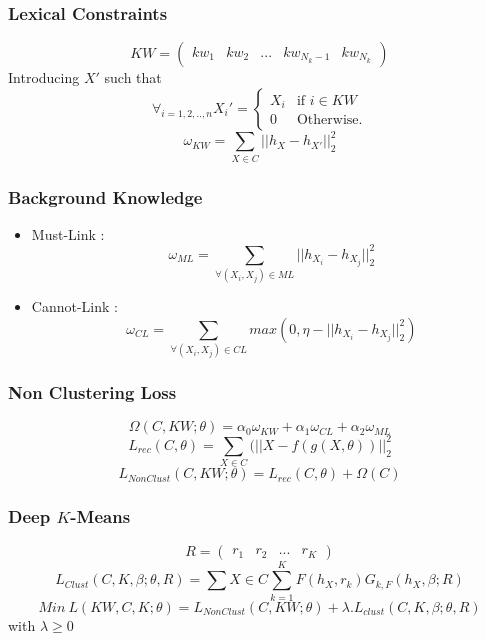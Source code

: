 \documentclass{beamer}
\begin{document}
\begin{frame}
\frametitle{Lexical Constraints}
\begin{equation*}
KW = \begin{pmatrix} kw_1 & kw_2 & ... & kw_{N_k-1} & kw_{N_k}
\end {pmatrix}
\end{equation*}
\pause
Introducing $X'$ such that
\begin{equation*}
\forall_{i=1,2,..,n}X_i' = \left\{
\begin{array}{ll}
  X_i & \mbox{if } i \in KW \\
  0 & \mbox{Otherwise.}
\end{array}
\right.
\end{equation*}
\pause
\begin{equation*}\label{eq:omega1}
  \omega_{KW} = \sum_{X \in C} || h_{X} - h_{X'}||_2^2
\end{equation*}
\end{frame}

\begin{frame}
\frametitle{Background Knowledge}
\pause
\begin{itemize}
\item Must-Link : $$\omega_{ML} = \sum_{\forall{(X_i,X_j)\in ML}} || h_{X_i} - h_{X_j} ||_2^2$$ \pause
\item Cannot-Link : $$\omega_{CL} = \sum_{\forall{(X_i,X_j)\in CL}} max(0,
  \eta - || h_{X_i} - h_{X_j} ||_2^2)$$
\end{itemize}
\end{frame}

\begin{frame}
\frametitle{Non Clustering Loss}
\begin{equation*}\label{eq:Sparse}
  \Omega(C, KW;\theta) = \alpha_0\omega_{KW} + \alpha_1\omega_{CL} + \alpha_2\omega_{ML}  
\end{equation*}
\pause
\begin{equation*}
  L_{rec}(C, \theta) = \sum_{X \in C}(||X - f(g(X, \theta))||_2^2
\end{equation*}
\pause
\begin{equation*}
  L_{NonClust}(C,KW; \theta) = L_{rec}(C, \theta) + \Omega(C)  
\end{equation*}

\end{frame}

\begin{frame}
\frametitle{Deep $K$-Means}
$$R = \begin{pmatrix} r_1 & r_2 & ... & r_K\end{pmatrix}$$
\pause
\begin{equation*}
  L_{Clust}(C, K, \beta; \theta, R) = \sum{X \in C}\sum_{k=1}^K F(h_X, r_k) G_{k, F}(h_X, \beta; R) 
\end{equation*}
\pause
\begin{equation*}
  Min~L(KW, C, K; \theta) = L_{NonClust}(C, KW; \theta) + \lambda.L_{clust}(C, K, \beta; \theta, R)
\end{equation*}
with $\lambda \geq 0$
\end{frame}
\end{document}
